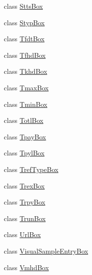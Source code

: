 \begin{DoxyCompactItemize}
\item 
class \mbox{\hyperlink{classmp4_parser_1_1_stts_box}{Stts\+Box}}
\item 
class \mbox{\hyperlink{classmp4_parser_1_1_styp_box}{Styp\+Box}}
\item 
class \mbox{\hyperlink{classmp4_parser_1_1_tfdt_box}{Tfdt\+Box}}
\item 
class \mbox{\hyperlink{classmp4_parser_1_1_tfhd_box}{Tfhd\+Box}}
\item 
class \mbox{\hyperlink{classmp4_parser_1_1_tkhd_box}{Tkhd\+Box}}
\item 
class \mbox{\hyperlink{classmp4_parser_1_1_tmax_box}{Tmax\+Box}}
\item 
class \mbox{\hyperlink{classmp4_parser_1_1_tmin_box}{Tmin\+Box}}
\item 
class \mbox{\hyperlink{classmp4_parser_1_1_totl_box}{Totl\+Box}}
\item 
class \mbox{\hyperlink{classmp4_parser_1_1_tpay_box}{Tpay\+Box}}
\item 
class \mbox{\hyperlink{classmp4_parser_1_1_tpyl_box}{Tpyl\+Box}}
\item 
class \mbox{\hyperlink{classmp4_parser_1_1_tref_type_box}{Tref\+Type\+Box}}
\item 
class \mbox{\hyperlink{classmp4_parser_1_1_trex_box}{Trex\+Box}}
\item 
class \mbox{\hyperlink{classmp4_parser_1_1_trpy_box}{Trpy\+Box}}
\item 
class \mbox{\hyperlink{classmp4_parser_1_1_trun_box}{Trun\+Box}}
\item 
class \mbox{\hyperlink{classmp4_parser_1_1_url_box}{Url\+Box}}
\item 
class \mbox{\hyperlink{classmp4_parser_1_1_visual_sample_entry_box}{Visual\+Sample\+Entry\+Box}}
\item 
class \mbox{\hyperlink{classmp4_parser_1_1_vmhd_box}{Vmhd\+Box}}
\end{DoxyCompactItemize}
